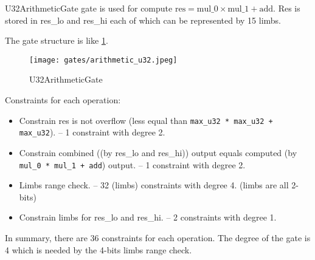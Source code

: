 
\hspace*{\fill}

\indent U32ArithmeticGate gate is used for compute $\text{res} = \text{mul\_0} \times \text{mul\_1} + \text{add}$. Res is stored in res\_lo and res\_hi each of which can be represented by 15 limbs.

The gate structure is like \ref{fig:arithmetic-u32}.

\begin{figure}[!ht]
    \centering
    \texttt{[image: gates/arithmetic\_u32.jpeg]}
    \caption{U32ArithmeticGate}
    \label{fig:arithmetic-u32}
\end{figure}

Constraints for each operation:
\begin{itemize}
    \item Constrain res is not overflow (less equal than \verb|max_u32 * max_u32 + max_u32|). -- 1 constraint with degree 2.
    \item Constrain combined ((by res\_lo and res\_hi)) output equals computed (by \verb|mul_0 * mul_1 + add|) output. -- 1 constraint with degree 2.
    \item Limbs range check. -- 32 (limbs) constraints with degree 4. (limbs are all 2-bits)
    \item Constrain limbs for res\_lo and res\_hi. -- 2 constraints with degree 1.
\end{itemize}

In summary, there are 36 constraints for each operation. The degree of the gate is 4 which is needed by the 4-bits limbs range check.
